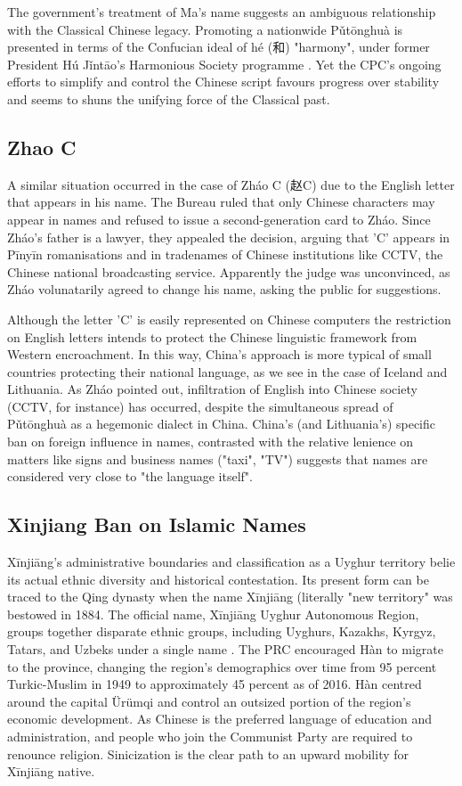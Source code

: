 The government's treatment of Ma's name suggests an ambiguous relationship with
the Classical Chinese legacy. Promoting a nationwide Pǔtōnghuà is presented in
terms of the Confucian ideal of hé ({\zafont 和}) "harmony", under former
President Hú Jǐntāo's Harmonious Society programme \parencite{wang16}. Yet the
CPC's ongoing efforts to simplify and control the Chinese script favours
progress over stability and seems to shuns the unifying force of the Classical
past.

\subsection{Zhao C}

A similar situation occurred in the case of Zháo C ({\zafont 赵}C) due to the
English letter that appears in his name. The Bureau ruled that only Chinese
characters may appear in names and refused to issue a second-generation card to
Zháo. Since Zháo's father is a lawyer, they appealed the decision, arguing that
'C' appears in Pīnyīn romanisations and in tradenames of Chinese institutions
like CCTV, the Chinese national broadcasting service. Apparently the judge was
unconvinced, as Zháo volunatarily agreed to change his name, asking the public
for suggestions. \parencite{martinsen09}

Although the letter 'C' is easily represented on Chinese computers the
restriction on English letters intends to protect the Chinese linguistic
framework from Western encroachment. In this way, China's approach is more
typical of small countries protecting their national language, as we see in the
case of Iceland and Lithuania. As Zháo pointed out, infiltration of English into
Chinese society (CCTV, for instance) has occurred, despite the simultaneous
spread of Pǔtōnghuà as a hegemonic dialect in China. China's (and Lithuania's)
specific ban on foreign influence in names, contrasted with the relative
lenience on matters like signs and business names ("taxi", "TV") suggests that
names are considered very close to "the language itself".

\subsection{Xinjiang Ban on Islamic Names}

Xīnjiāng's administrative boundaries and classification as a Uyghur territory
belie its actual ethnic diversity and historical contestation. Its present form
can be traced to the Qing dynasty when the name Xīnjiāng (literally "new
territory" was bestowed in 1884. The official name, Xīnjiāng Uyghur Autonomous
Region, groups together disparate ethnic groups, including Uyghurs, Kazakhs,
Kyrgyz, Tatars, and Uzbeks under a single name \parencite{ang16}. The PRC
encouraged Hàn to migrate to the province, changing the region's demographics
over time from 95 percent Turkic-Muslim in 1949 to approximately 45 percent as
of 2016. Hàn centred around the capital Ürümqi and control an outsized portion
of the region's economic development. As Chinese is the preferred language of
education and administration, and people who join the Communist Party are
required to renounce religion. Sinicization is the clear path to an upward
mobility for Xīnjiāng native.

